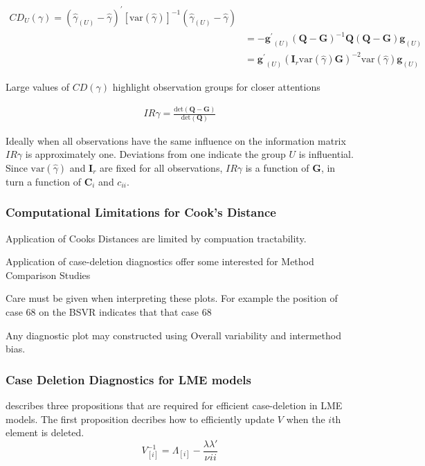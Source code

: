 \documentclass[12pt, a4paper]{report}
\theoremstyle{plain}
\theoremstyle{definition}
\theoremstyle{remark}
\begin{document}
	\begin{eqnarray*}
		CD_{U}(\gamma) = (\hat{\gamma}_{(U)} - \hat{\gamma})^{\prime}[\mbox{var}(\hat{\gamma})]^{-1}(\hat{\gamma}_{(U)} - \hat{\gamma})\\
		&= -\boldsymbol{g^{\prime}}_{(U)} (\boldsymbol{Q}-\boldsymbol{G})^{-1}\boldsymbol{Q}(\boldsymbol{Q}-\boldsymbol{G})\boldsymbol{g}_{(U)} \\
		&= \boldsymbol{g^{\prime}}_{(U)} (\boldsymbol{I}_{r}  \mbox{var}(\hat{\gamma})\boldsymbol{G})^{-2}\mbox{var}(\hat{\gamma})\boldsymbol{g}_{(U)}
	\end{eqnarray*}
	
	Large values of $CD(\gamma)$ highlight observation groups for closer attentions
	

	\begin{eqnarray*}
		IR{\gamma}  = \frac{\mbox{det}(\boldsymbol{Q} - \boldsymbol{G})}{\mbox{det}(\boldsymbol{Q})}
	\end{eqnarray*}
	
	Ideally when all observations have the same influence on the information matrix $IR{\gamma}$ is approximately one.
	Deviations from one indicate the group $U$ is influential. Since $\mbox{var}(\hat{\gamma})$ and $\boldsymbol{I}_{r}$ are fixed for all observations, $IR{\gamma}$ is a function of $\boldsymbol{G}$, in turn a function of $\boldsymbol{C}_{i}$ and $c_{ii}$.


	\subsubsection{Computational Limitations for Cook's Distance}
	Application of Cooks Distances are limited by compuation tractability.
	
	
	Application of case-deletion diagnostics offer some interested for Method Comparison Studies
	
	
	Care must be given when interpreting these plots. For example the position of case 68 on the BSVR indicates that that
	case 68
	

	
	Any diagnostic plot may constructed using Overall variability and intermethod bias.
	

	\subsubsection{Case Deletion Diagnostics for LME models}
	
	
	
	\citet{Christensen} describes three propositions that are required
	for efficient case-deletion in LME models. The first proposition
	decribes how to efficiently update $V$ when the $i$th element is
	deleted.
	\begin{equation}
	V_{[i]}^{-1} = \Lambda_{[i]} - \frac{\lambda
		\lambda\prime}{\nu^{}ii}
	\end{equation}
	
\end{document}
